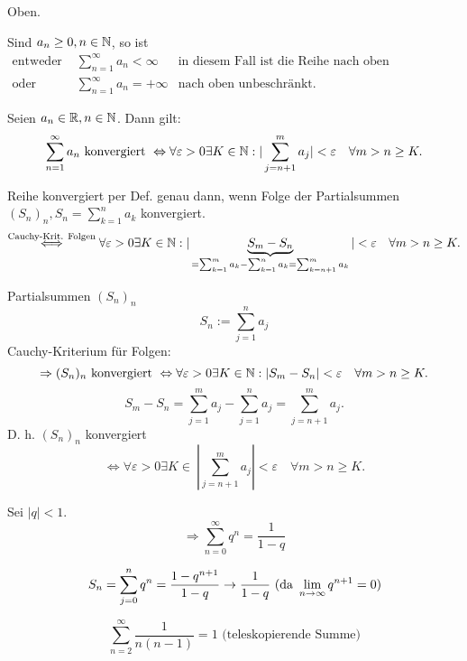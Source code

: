 \documentclass[../ana1.tex]{subfiles}
\begin{document}
\begin{bew}
	Oben.
\end{bew}
\begin{kor}
	Sind \(a_n \geq 0, n\in \mathbb{N} \), so ist
	\begin{align*}
		\text{entweder } &\sum_{n=1}^{\infty}a_n < \infty &\text{in diesem Fall ist die Reihe nach oben beschränkt.}\\
		\text{oder } &\sum_{n=1}^{\infty}a_n = +\infty &\text{nach oben unbeschränkt.}
	\end{align*}
\end{kor}
\begin{satz}
	Seien \(a_n \in\mathbb{R}, n\in\mathbb{N}\). Dann gilt: 
	\[ \sum_{n=1}^{\infty} a_n \text{ konvergiert } \Leftrightarrow \forall \varepsilon >0 \exists K \in \mathbb{N} : | \sum_{j=n+1}^{m}a_j|<\varepsilon \quad \forall m>n\geq K.\]
\end{satz}
\begin{bew}%
	Reihe konvergiert per Def. genau dann, wenn Folge der Partialsummen \( (S_n)_n, S_n = \sum_{k=1}^{n}a_k \) konvergiert.
	\[ \overset{\text{Cauchy-Krit. Folgen}}{\Longleftrightarrow} \forall \varepsilon > 0 \exists K\in\mathbb{N}: |\underbrace{S_m-S_n}_{=\sum_{k=1}^{m}a_k-\sum_{k=1}^{n}a_k=\sum_{k=n+1}^{m}a_k}|<\varepsilon \quad \forall m>n\geq K. \]
\end{bew}
\begin{bew}%
	Partialsummen \((S_n)_n\)
	\[ S_n := \sum_{j=1}^{n} a_j \]
	Cauchy-Kriterium  für Folgen:
	\[ \Rightarrow (S_n)_n \text{ konvergiert } \Leftrightarrow \forall \varepsilon > 0 \exists K\in\mathbb{N}:|S_m-S_n|<\varepsilon \quad \forall m>n\geq K. \]
	\[ S_m - S_n = \sum_{j=1}^{m}a_j - \sum_{j=1}^{n} a_j = \sum_{j=n+1}^{m} a_j. \]
	D. h. \((S_n)_n\) konvergiert \[ \Leftrightarrow \forall \varepsilon > 0 \exists K\in\: |\sum_{j=n+1}^{m}a_j|<\varepsilon \quad \forall m>n\geq K. \]
\end{bew}
\begin{bsp}
	Sei \(|q|<1\).
	\[ \Rightarrow \sum_{n=0}^{\infty} q^n = \frac{1}{1-q} \]
\end{bsp}
\begin{bsp}
	\[S_n = \sum_{j=0}^{n} q^n = \frac{1-q^{n+1}}{1-q} \rightarrow \frac{1}{1-q} \text{ (da } \lim\limits_{n\rightarrow\infty}q^{n+1}=0 \text{)} \]
\end{bsp}
\begin{bsp}
	\[\sum_{n=2}^{\infty}\frac{1}{n(n-1)}=1 \text{ (teleskopierende Summe)} \]
\end{bsp}
\end{document}
